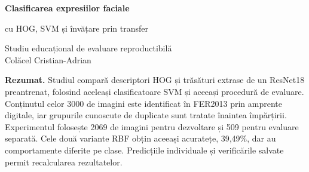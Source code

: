 \documentclass[10pt,a4paper]{article}
\begin{document}
\thispagestyle{plain}
\begin{center}
{\LARGE\bfseries Clasificarea expresiilor faciale\par}
\vspace{5pt}
{\Large cu HOG, SVM și învățare prin transfer\par}
\vspace{8pt}
Studiu educațional de evaluare reproductibilă\\[5pt]
Colăcel Cristian-Adrian
\end{center}
\vspace{5pt}
\textbf{Rezumat.} Studiul compară descriptori HOG și trăsături extrase de un
ResNet18 preantrenat, folosind aceleași clasificatoare SVM și aceeași procedură
de evaluare. Conținutul celor 3000 de imagini este identificat în FER2013 prin
amprente digitale, iar grupurile cunoscute de duplicate sunt tratate înaintea împărțirii.
Experimentul folosește 2069 de imagini pentru dezvoltare și 509 pentru evaluare
separată. Cele două variante RBF obțin aceeași acuratețe, 39,49\%, dar au
comportamente diferite pe clase. Predicțiile individuale și verificările
salvate permit recalcularea rezultatelor.
\end{document}
